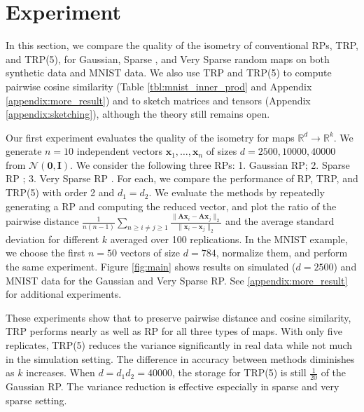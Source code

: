 \section{Experiment} \label{sec:simulation}
In this section, we compare the quality of the isometry of
conventional RPs, TRP, and TRP(5), for
Gaussian, Sparse \cite{achlioptas2003database},
and Very Sparse random maps \cite{li2006very} on both synthetic data and MNIST data.
We also use TRP and TRP(5) to compute pairwise cosine similarity
(Table \ref{tbl:mnist_inner_prod} and Appendix \ref{appendix:more_result})
and to sketch matrices and tensors
(Appendix \ref{appendix:sketching}),
although the theory still remains open.

Our first experiment evaluates the quality of the isometry for maps $\mathbb{R}^d \to \mathbb{R}^k$.
We generate $n=10$ independent vectors $\mathbf{x}_1, \dots, \mathbf{x}_n$ of sizes
$d = 2500, 10000, 40000$ from $\mathcal{N}(\mathbf{0},\mathbf{I})$.
We consider the following three RPs:
1. Gaussian RP; 2. Sparse RP \cite{achlioptas2003database}; 3. Very Sparse RP \cite{li2006very}.
For each, we compare the performance of RP, TRP, and TRP(5) with order 2 and $d_1=d_2$.
We evaluate the methods by repeatedly generating a RP and computing the reduced vector,
and plot the ratio of the pairwise distance
$\frac{1}{n(n-1)}\sum_{n \geq i\neq j \geq 1}\frac{\|\mathbf{A}\mathbf{x}_i - \mathbf{A}\mathbf{x}_j\|_2}{\|\mathbf{x}_i - \mathbf{x}_j\|_2}$
and the average standard deviation for different $k$
averaged over 100 replications.
In the MNIST example, we choose the first $n = 50$ vectors of size $d = 784$, normalize them,
and perform the same experiment.
Figure \ref{fig:main} shows results on simulated ($d = 2500$) and MNIST data
for the Gaussian and Very Sparse RP.
See \ref{appendix:more_result} for additional experiments.

These experiments show that to preserve pairwise distance and cosine similarity,
TRP performs nearly as well as RP for all three types of maps.
With only five replicates, TRP(5) reduces the variance significantly in real data while not much in the simulation setting.
The difference in accuracy between methods diminishes as $k$ increases.
When $d = d_1d_2 = 40000$, the storage for TRP(5) is still $\frac{1}{20}$ of the Gaussian RP.
The variance reduction is effective especially in sparse and very sparse setting.


